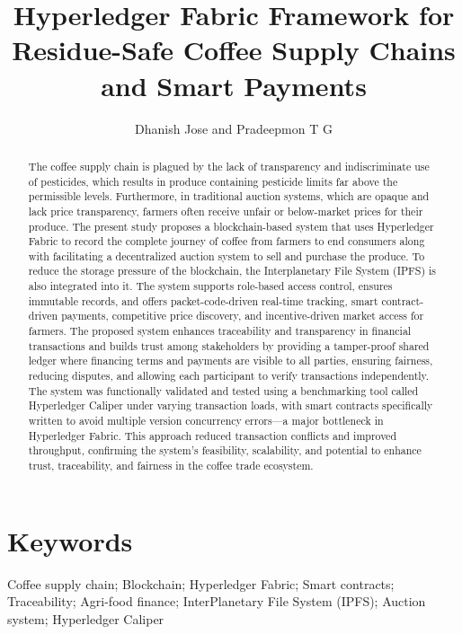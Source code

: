 \documentclass[12pt]{article}
\title{Hyperledger Fabric Framework for Residue-Safe Coffee Supply Chains and Smart Payments}
\author{Dhanish Jose and Pradeepmon T G}
\affil{Department of Mechanical Engineering, National Institute of Technology Calicut, India}
\date{}
\begin{document}
	
	\maketitle
	
	\begin{abstract}
		The coffee supply chain is plagued by the lack of transparency and indiscriminate use of pesticides, which results in produce containing pesticide limits far above the permissible levels. Furthermore, in traditional auction systems, which are opaque and lack price transparency, farmers often receive unfair or below-market prices for their produce. The present study proposes a blockchain-based system that uses Hyperledger Fabric to record the complete journey of coffee from farmers to end consumers along with facilitating a decentralized auction system to sell and purchase the produce. To reduce the storage pressure of the blockchain, the Interplanetary File System (IPFS) is also integrated into it. The system supports role-based access control, ensures immutable records, and offers packet-code-driven real-time tracking, smart contract-driven payments, competitive price discovery, and incentive-driven market access for farmers. The proposed system enhances traceability and transparency in financial transactions and builds trust among stakeholders by providing a tamper-proof shared ledger where financing terms and payments are visible to all parties, ensuring fairness, reducing disputes, and allowing each participant to verify transactions independently. The system was functionally validated and tested using a benchmarking tool called Hyperledger Caliper under varying transaction loads, with smart contracts specifically written to avoid multiple version concurrency errors—a major bottleneck in Hyperledger Fabric. This approach reduced transaction conflicts and improved throughput, confirming the system’s feasibility, scalability, and potential to enhance trust, traceability, and fairness in the coffee trade ecosystem.
	\end{abstract}
	
	
	
	
	
	\section*{Keywords}
	Coffee supply chain; Blockchain; Hyperledger Fabric; Smart contracts; 
	Traceability; Agri-food finance; InterPlanetary File System (IPFS); 
	Auction system; Hyperledger Caliper
	
\end{document}
